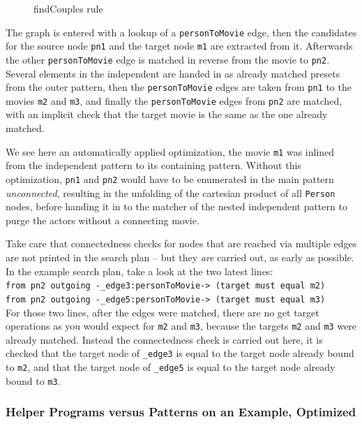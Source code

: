 \begin{figure}[h]
	
	\caption{findCouples rule}
	\label{fig:findCouples.grg}
\end{figure}

The graph is entered with a lookup of a \texttt{personToMovie} edge, then the candidates for the source node \texttt{pn1} and the target node \texttt{m1} are extracted from it. Afterwards the other \texttt{personToMovie} edge is matched in reverse from the movie to \texttt{pn2}.
Several elements in the independent are handed in as already matched presets from the outer pattern, then the \texttt{personToMovie} edges are taken from \texttt{pn1} to the movies \texttt{m2} and \texttt{m3}, and finally the \texttt{personToMovie} edges from \texttt{pn2} are matched, with an implicit check that the target movie is the same as the one already matched.

We see here an automatically applied optimization, the movie \texttt{m1} was inlined from the independent pattern to its containing pattern. Without this optimization, \texttt{pn1} and \texttt{pn2} would have to be enumerated in the main pattern \emph{unconnected}, resulting in the unfolding of the cartesian product of all \texttt{Person} nodes, before handing it in to the matcher of the nested independent pattern to purge the actors without a connecting movie.

Take care that connectedness checks for nodes that are reached via multiple edges are not printed in the search plan -- but they \emph{are} carried out, as early as possible.
In the example search plan, take a look at the two latest lines:\\
\verb#from pn2 outgoing -_edge3:personToMovie-> (target must equal m2)#\\
\verb#from pn2 outgoing -_edge5:personToMovie-> (target must equal m3)#\\
For those two lines, after the edges were matched, there are no get target operations as you would expect for \texttt{m2} and \texttt{m3}, because the targets \texttt{m2} and \texttt{m3} were already matched.
Instead the connectedness check is carried out here, it is checked that the target node of \verb#_edge3# is equal to the target node already bound to \texttt{m2}, and that the target node of \verb#_edge5# is equal to the target node already bound to \texttt{m3}.

\subsubsection*{Helper Programs versus Patterns on an Example, Optimized}

